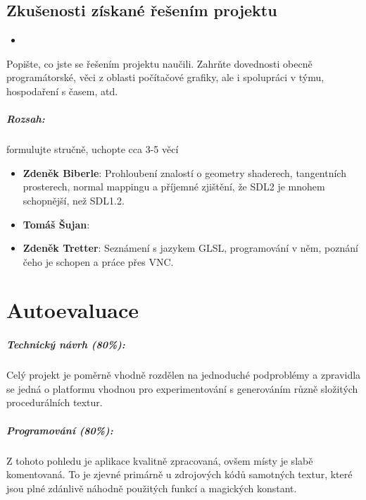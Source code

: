 \documentclass[12pt,a4paper,titlepage,final]{report}
\newcommand\AuthorA{Zdeněk Biberle}
\newcommand\AuthorB{Tomáš Šujan}
\newcommand\AuthorC{Zdeněk Tretter}
\begin{document}
\section{Zkušenosti získané řešením projektu}

\begin{itemize}
	\item 
\end{itemize}

Popište, co jste se řešením projektu naučili. Zahrňte dovednosti obecně
programátorské, věci z oblasti počítačové grafiky, ale i spolupráci v týmu,
hospodaření s časem, atd.

\paragraph{Rozsah:} formulujte stručně, uchopte cca 3-5 věcí

\begin{itemize}
\item \textbf{\AuthorA}: Prohloubení znalostí o geometry shaderech, tangentních prosterech, normal mappingu a příjemné zjištění, že SDL2 je mnohem schopnější, než SDL1.2.
\item \textbf{\AuthorB}:
\item \textbf{\AuthorC}: Seznámení s jazykem GLSL, programování v něm, poznání čeho je schopen a práce přes VNC.
\end{itemize}

\chapter{Autoevaluace}

\paragraph{Technický návrh (80\%):} Celý projekt je poměrně vhodně rozdělen na jednoduché podproblémy a zpravidla se jedná o platformu vhodnou pro experimentování s generováním různě složitých procedurálních textur.

\paragraph{Programování (80\%):} Z tohoto pohledu je aplikace kvalitně zpracovaná, ovšem místy je slabě komentovaná. To je zjevné primárně u zdrojových kódů samotných textur, které jsou plné zdánlivě náhodně použitých funkcí a magických konstant.
\end{document}
